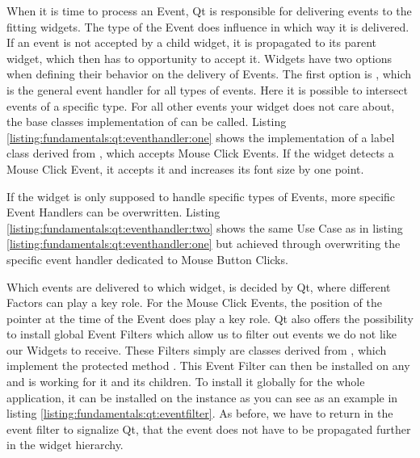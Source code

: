 When it is time to process an Event, Qt is responsible for delivering events to
the fitting widgets. The type of the Event does influence in which way it is
delivered. If an event is not accepted by a child widget, it is propagated to
its parent widget, which then has to opportunity to accept it. Widgets have two
options when defining their behavior on the delivery of Events.  The first
option is , which is the general
event handler for all types of events. Here it is possible to intersect events
of a specific type. For all other events your widget does not care about, the
base classes implementation of  can be called.
Listing \ref{listing:fundamentals:qt:eventhandler:one} shows the implementation
of a label class derived from , which
accepts Mouse Click Events. If the widget detects a Mouse Click Event, it
accepts it and increases its font size by one point.



If the widget is only supposed to handle specific types of Events, more specific
Event Handlers can be overwritten. Listing
\ref{listing:fundamentals:qt:eventhandler:two} shows the same Use Case as in
listing \ref{listing:fundamentals:qt:eventhandler:one} but achieved through
overwriting the specific event handler dedicated to Mouse Button Clicks.



Which events are delivered to which widget, is decided by Qt, where different
Factors can play a key role. For the Mouse Click Events, the position of the
pointer at the time of the Event does play a key role. Qt also offers the
possibility to install global Event Filters which allow us to filter out events
we do not like our Widgets to receive. These Filters simply are classes derived
from , which implement the protected method
. This Event
Filter can then be installed on any  and is
working for it and its children. To install it globally for the whole
application, it can be installed on the
 instance as you can see as an example
in listing \ref{listing:fundamentals:qt:eventfilter}. As before, we have to
return  in the event filter to signalize Qt, that the
event does not have to be propagated further in the widget hierarchy.

